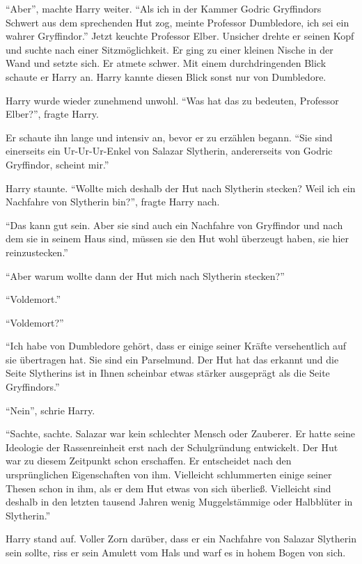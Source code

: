 \enquote{Aber}, machte Harry weiter. \enquote{Als ich in der Kammer Godric Gryffindors Schwert aus dem sprechenden Hut zog, meinte Professor Dumbledore, ich sei ein wahrer Gryffindor.} Jetzt keuchte Professor Elber. Unsicher drehte er seinen Kopf und suchte nach einer Sitzmöglichkeit. Er ging zu einer kleinen Nische in der Wand und setzte sich. Er atmete schwer. Mit einem durchdringenden Blick schaute er Harry an. Harry kannte diesen Blick sonst nur von Dumbledore.

Harry wurde wieder zunehmend unwohl. \enquote{Was hat das zu bedeuten, Professor Elber?}, fragte Harry.

Er schaute ihn lange und intensiv an, bevor er zu erzählen begann. \enquote{Sie sind einerseits ein Ur-Ur-Ur-Enkel von Salazar Slytherin, andererseits von Godric Gryffindor, scheint mir.}

Harry staunte. \enquote{Wollte mich deshalb der Hut nach Slytherin stecken? Weil ich ein Nachfahre von Slytherin bin?}, fragte Harry nach.

\enquote{Das kann gut sein. Aber sie sind auch ein Nachfahre von Gryffindor und nach dem sie in seinem Haus sind, müssen sie den Hut wohl überzeugt haben, sie hier reinzustecken.}

\enquote{Aber warum wollte dann der Hut mich nach Slytherin stecken?}

\enquote{Voldemort.}

\enquote{Voldemort?}

\enquote{Ich habe von Dumbledore gehört, dass er einige seiner Kräfte versehentlich auf sie übertragen hat. Sie sind ein Parselmund. Der Hut hat das erkannt und die Seite Slytherins ist in Ihnen scheinbar etwas stärker ausgeprägt als die Seite Gryffindors.}

\enquote{Nein}, schrie Harry.

\enquote{Sachte, sachte. Salazar war kein schlechter Mensch oder Zauberer. Er hatte seine Ideologie der Rassenreinheit erst nach der Schulgründung entwickelt. Der Hut war zu diesem Zeitpunkt schon erschaffen. Er entscheidet nach den ursprünglichen Eigenschaften von ihm. Vielleicht schlummerten einige seiner Thesen schon in ihm, als er dem Hut etwas von sich überließ. Vielleicht sind deshalb in den letzten tausend Jahren wenig Muggelstämmige oder Halbblüter in Slytherin.}

Harry stand auf. Voller Zorn darüber, dass er ein Nachfahre von Salazar Slytherin sein sollte, riss er sein Amulett vom Hals und warf es in hohem Bogen von sich.

